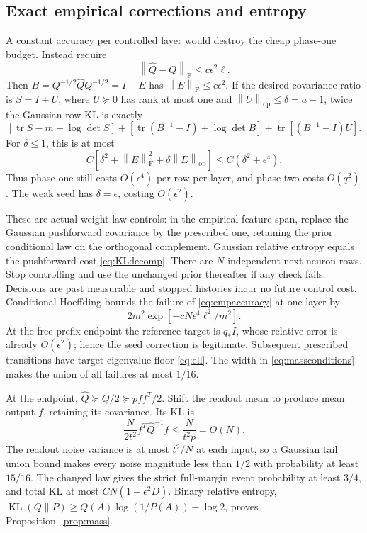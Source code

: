 \documentclass[11pt]{article}
\newcommand{\KL}{\operatorname{KL}}\newcommand{\tr}{\operatorname{tr}}
\newcommand{\op}{\mathrm{op}}\newcommand{\F}{\mathrm F}
\newcommand{\norm}[1]{\left\lVert#1\right\rVert}
\begin{document}
\subsection{Exact empirical corrections and entropy}
A constant accuracy per controlled layer would destroy the cheap phase-one budget. Instead require
\begin{equation}\label{eq:empaccuracy}
 \norm{\widehat Q-Q}_\F\le c\epsilon^2\ell.
\end{equation}
Then $B=Q^{-1/2}\widehat Q Q^{-1/2}=I+E$ has $\norm E_\F\le c\epsilon^2$. If the desired covariance ratio is $S=I+U$, where $U\succeq0$ has rank at most one and $\norm U_\op\le\delta=a-1$, twice the Gaussian row KL is exactly
\begin{equation}\label{eq:KLdecomp}
 [\tr S-m-\log\det S]+[\tr(B^{-1}-I)+\log\det B]
                     +\tr[(B^{-1}-I)U].
\end{equation}
For $\delta\le1$, this is at most
\begin{equation}
 C[\delta^2+\norm E_\F^2+\delta\norm E_\op]
 \le C(\delta^2+\epsilon^4).
\end{equation}
Thus phase one still costs $O(\epsilon^4)$ per row per layer, and phase two costs $O(q^2)$. The weak seed has $\delta=\epsilon$, costing $O(\epsilon^2)$.

These are actual weight-law controls: in the empirical feature span, replace the Gaussian pushforward covariance by the prescribed one, retaining the prior conditional law on the orthogonal complement. Gaussian relative entropy equals the pushforward cost \eqref{eq:KLdecomp}. There are $N$ independent next-neuron rows. Stop controlling and use the unchanged prior thereafter if any check fails. Decisions are past measurable and stopped histories incur no future control cost. Conditional Hoeffding bounds the failure of \eqref{eq:empaccuracy} at one layer by
\begin{equation}
 2m^2\exp[-cN\epsilon^4\ell^2/m^2].
\end{equation}
At the free-prefix endpoint the reference target is $q_*I$, whose relative error is already $O(\epsilon^2)$; hence the seed correction is legitimate. Subsequent prescribed transitions have target eigenvalue floor \eqref{eq:ell}. The width in \eqref{eq:massconditions} makes the union of all failures at most $1/16$.

At the endpoint, $\widehat Q\succeq Q/2\succeq pff^T/2$. Shift the readout mean to produce mean output $f$, retaining its covariance. Its KL is
\begin{equation}
 \frac{N}{2t^2}f^T\widehat Q^{-1}f\le\frac{N}{t^2p}=O(N).
\end{equation}
The readout noise variance is at most $t^2/N$ at each input, so a Gaussian tail union bound makes every noise magnitude less than $1/2$ with probability at least $15/16$. The changed law gives the strict full-margin event probability at least $3/4$, and total KL at most $CN(1+\epsilon^2D)$. Binary relative entropy, $\KL(Q\|P)\ge Q(A)\log(1/P(A))-\log2$, proves Proposition~\ref{prop:mass}.
\end{document}
